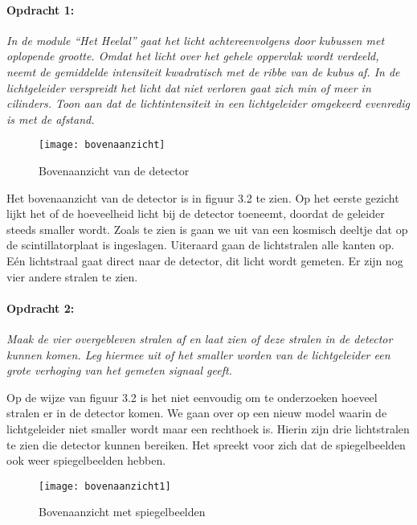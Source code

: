 \paragraph*{Opdracht 1:}

\emph{In de module ``Het Heelal'' gaat het licht achtereenvolgens
door kubussen met oplopende grootte. Omdat het licht over het gehele
oppervlak wordt verdeeld, neemt de gemiddelde intensiteit kwadratisch
met de ribbe van de kubus af. In de lichtgeleider verspreidt het licht
dat niet verloren gaat zich min of meer in cilinders. Toon aan dat
de lichtintensiteit in een lichtgeleider omgekeerd evenredig is met
de afstand.}

\begin{figure}[H]
\noindent \begin{centering}
\texttt{[image: bovenaanzicht]}
\par\end{centering}

\caption{Bovenaanzicht van de detector}
\end{figure}


Het bovenaanzicht van de detector is in figuur 3.2 te zien. Op het
eerste gezicht lijkt het of de hoeveelheid licht bij de detector toeneemt,
doordat de geleider steeds smaller wordt. Zoals te zien is gaan we
uit van een kosmisch deeltje dat op de scintillatorplaat is ingeslagen.
Uiteraard gaan de lichtstralen alle kanten op. Eén lichtstraal gaat
direct naar de detector, dit licht wordt gemeten. Er zijn nog vier
andere stralen te zien.


\paragraph*{Opdracht 2:}

\emph{Maak de vier overgebleven stralen af en laat zien of deze stralen
in de detector kunnen komen. Leg hiermee uit of het smaller worden
van de lichtgeleider een grote verhoging van het gemeten signaal geeft.}

Op de wijze van figuur 3.2 is het niet eenvoudig om te onderzoeken
hoeveel stralen er in de detector komen. We gaan over op een nieuw
model waarin de lichtgeleider niet smaller wordt maar een rechthoek
is. Hierin zijn drie lichtstralen te zien die detector kunnen bereiken.
Het spreekt voor zich dat de spiegelbeelden ook weer spiegelbeelden
hebben.

\begin{figure}[H]
\noindent \begin{centering}
\texttt{[image: bovenaanzicht1]}
\par\end{centering}

\caption{Bovenaanzicht met spiegelbeelden}
\end{figure}


